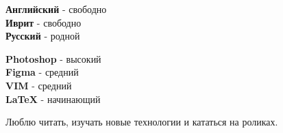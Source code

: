 \documentclass[9pt]{developercv} %
\begin{document}

\begin{minipage}[t]{0.3\textwidth}
	\vspace{-\baselineskip} %

	
	\textbf{Английский} - свободно\\
	\textbf{Иврит} - свободно\\
	\textbf{Русский} - родной\\
\end{minipage}
\hfill
\begin{minipage}[t]{0.3\textwidth}
	\vspace{-\baselineskip} %
	
  
  \textbf{Photoshop} - высокий \\
  \textbf{Figma} - средний \\ 
  \textbf{VIM} - средний \\ 
  \textbf{\LaTeX} - начинающий \\ 
	
	\end{minipage}
\hfill
\begin{minipage}[t]{0.3\textwidth}
	\vspace{-\baselineskip} %
	

Люблю читать, изучать новые технологии и кататься на роликах.	
	\end{minipage}
\hfill

\begin{minipage}[t]{1\textwidth}
	\vspace{1pt} %
	
	\hfill
	\hfill
	\hfill
\end{minipage}

\vspace{0.5cm}
\end{document}
